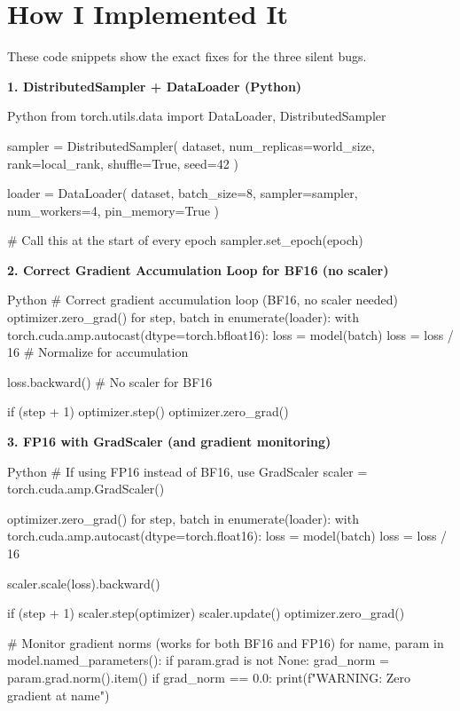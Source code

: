 \documentclass[11pt]{article}
\begin{document}
\section*{How I Implemented It}

\vspace{0.05in}

These code snippets show the exact fixes for the three silent bugs.


\vspace{0.05in}

\textbf{1. DistributedSampler + DataLoader (Python)}

\begin{codebox}{Python}
from torch.utils.data import DataLoader, DistributedSampler

sampler = DistributedSampler(
    dataset,
    num_replicas=world_size,
    rank=local_rank,
    shuffle=True,
    seed=42
)

loader = DataLoader(
    dataset,
    batch_size=8,
    sampler=sampler,
    num_workers=4,
    pin_memory=True
)

# Call this at the start of every epoch
sampler.set_epoch(epoch)
\end{codebox}

\vspace{0.05in}

\newpage
\textbf{2. Correct Gradient Accumulation Loop for BF16 (no scaler)}

\begin{codebox}{Python}
# Correct gradient accumulation loop (BF16, no scaler needed)
optimizer.zero_grad()
for step, batch in enumerate(loader):
    with torch.cuda.amp.autocast(dtype=torch.bfloat16):
        loss = model(batch)
        loss = loss / 16  # Normalize for accumulation

    loss.backward()  # No scaler for BF16

    if (step + 1) %
        optimizer.step()
        optimizer.zero_grad()
\end{codebox}

\vspace{0.08in}

\textbf{3. FP16 with GradScaler (and gradient monitoring)}

\begin{codebox}{Python}
# If using FP16 instead of BF16, use GradScaler
scaler = torch.cuda.amp.GradScaler()

optimizer.zero_grad()
for step, batch in enumerate(loader):
    with torch.cuda.amp.autocast(dtype=torch.float16):
        loss = model(batch)
        loss = loss / 16

    scaler.scale(loss).backward()

    if (step + 1) %
        scaler.step(optimizer)
        scaler.update()
        optimizer.zero_grad()

# Monitor gradient norms (works for both BF16 and FP16)
for name, param in model.named_parameters():
    if param.grad is not None:
        grad_norm = param.grad.norm().item()
        if grad_norm == 0.0:
            print(f"WARNING: Zero gradient at {name}")
\end{codebox}
\end{document}
